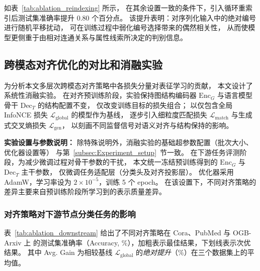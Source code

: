 如表~\ref{tab:ablation_reindexing} 所示，
在其余设置一致的条件下，引入循环重索引后测试集准确率提升 0.80 个百分点。
该提升表明：对序列化输入中的绝对编号进行随机平移扰动，
可在训练过程中弱化编号选择带来的偶然相关性，
从而使模型更侧重于由相对连通关系与属性线索所决定的判别信息。

\subsection{跨模态对齐优化的对比和消融实验}
\label{sec:ablation_alignment}

为分析本文多层次跨模态对齐策略中各损失分量对表征学习的贡献，
本文设计了系统性消融实验。
在对齐预训练阶段，实验保持图结构编码器 $\mathrm{Enc}_G$ 与语言模型骨干 $\mathrm{Dec}_T$ 的结构配置不变，
仅改变训练目标的损失组合；
以仅包含全局 InfoNCE 损失 $\mathcal{L}_{\mathrm{global}}$ 的模型作为基线，
逐步引入细粒度匹配损失 $\mathcal{L}_{\mathrm{match}}$ 与生成式交叉熵损失 $\mathcal{L}_{\mathrm{gen}}$，
以刻画不同监督信号对语义对齐与结构保持的影响。

\textbf{实验设置与参数说明：} 除特殊说明外，消融实验的基础超参数配置（批次大小、优化器设置等）
与第~\ref{subsec:Experiment_setup}~节一致。
在下游任务评测阶段，为减少微调过程对骨干参数的干扰，
本文统一冻结预训练得到的 $\mathrm{Enc}_G$ 与 $\mathrm{Dec}_T$ 主干参数，
仅微调任务适配层（分类头及对齐投影层）。
优化器采用 AdamW，学习率设为 $2\times10^{-5}$，训练 5 个 epoch。
在该设置下，不同对齐策略的差异主要来自预训练阶段所学习到的表示质量差异。

\subsubsection{对齐策略对下游节点分类任务的影响}

表~\ref{tab:ablation_downstream} 
给出了不同对齐策略在 Cora、PubMed 与 OGB-Arxiv 上
的测试集准确率（Accuracy, \%），加粗表示最佳结果，下划线表示次优结果。
其中 Avg. Gain 为相较基线 $\mathcal{L}_{\mathrm{global}}$ 
的\emph{绝对提升}（\%）在三个数据集上的平均值。


\begin{table}[htbp]
  \centering
  \caption{图结构和文本的跨模态对齐损失函数的消融实验}
  \label{tab:ablation_downstream}
\end{table}

